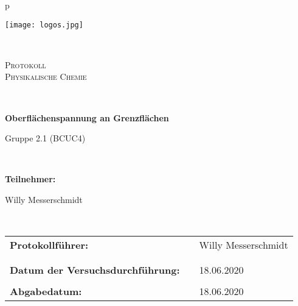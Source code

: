 \begin{center}
\begin{tabular}{p{\textwidth}}


\begin{center}
\texttt{[image: logos.jpg]}\\
\end{center}


\\

\begin{center}
\LARGE{\textsc{
Protokoll \\
Physikalische Chemie\\
}}
\end{center}

\\

%

\begin{center}
\textbf{\Large{Oberflächenspannung an Grenzflächen}}
\end{center}

\begin{center}
	\large{Gruppe 2.1 (BCUC4)}
\end{center}


\\



\begin{center}
\Large{\textbf{Teilnehmer:}} \\ 
\end{center}
\begin{center}
\large{
	Willy Messerschmidt}
	
\end{center}


\\

\begin{center}
\begin{tabular}{lll}
\large{\textbf{Protokollführer:}} & & \large{Willy Messerschmidt} \\
&& \\
&&\\
\large{\textbf{Datum der Versuchsdurchführung:}}&& \large{18.06.2020}\\
&&\\
\large{\textbf{Abgabedatum:}}&& \large{18.06.2020}
\end{tabular}
\end{center}


\end{tabular}
\end{center}
